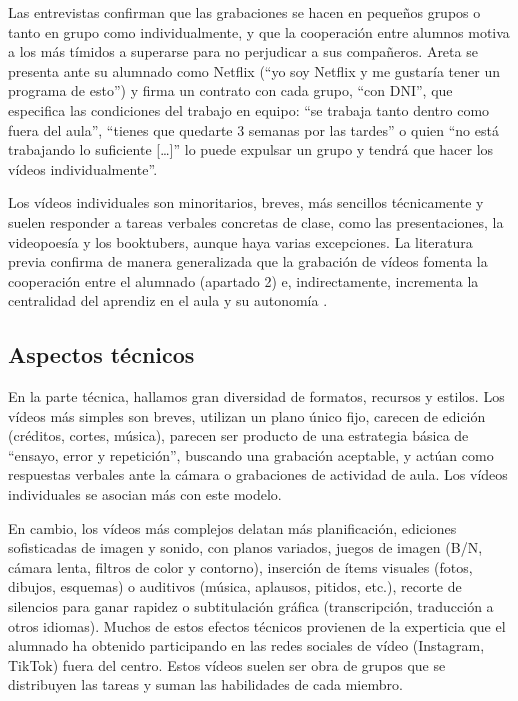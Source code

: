 \documentclass[spanish]{textolivre}
\begin{document}
Las entrevistas confirman que las grabaciones se hacen en pequeños grupos o tanto en grupo como individualmente, y que la cooperación entre alumnos motiva a los más tímidos a superarse para no perjudicar a sus compañeros. Areta se presenta ante su alumnado como Netflix (“yo soy Netflix y me gustaría tener un programa de esto”) y firma un contrato con cada grupo, “con DNI”, que especifica las condiciones del trabajo en equipo: “se trabaja tanto dentro como fuera del aula”, “tienes que quedarte 3 semanas por las tardes” o quien “no está trabajando lo suficiente […]” lo puede expulsar un grupo y tendrá que hacer los vídeos individualmente”.

Los vídeos individuales son minoritarios, breves, más sencillos técnicamente y suelen responder a tareas verbales concretas de clase, como las presentaciones, la videopoesía y los booktubers, aunque haya varias excepciones. La literatura previa confirma de manera generalizada que la grabación de vídeos fomenta la cooperación entre el alumnado (apartado 2) e, indirectamente, incrementa la centralidad del aprendiz en el aula y su autonomía \cite{vasquez_bustamante_aprendizaje_2013}.

\subsection{Aspectos técnicos}\label{sec-idioma}
En la parte técnica, hallamos gran diversidad de formatos, recursos y estilos. Los vídeos más simples son breves, utilizan un plano único fijo, carecen de edición (créditos, cortes, música), parecen ser producto de una estrategia básica de “ensayo, error y repetición”, buscando una grabación aceptable, y actúan como respuestas verbales ante la cámara o grabaciones de actividad de aula. Los vídeos individuales se asocian más con este modelo.

En cambio, los vídeos más complejos delatan más planificación, ediciones sofisticadas de imagen y sonido, con planos variados, juegos de imagen (B/N, cámara lenta, filtros de color y contorno), inserción de ítems visuales (fotos, dibujos, esquemas) o auditivos (música, aplausos, pitidos, etc.), recorte de silencios para ganar rapidez o subtitulación gráfica (transcripción, traducción a otros idiomas). Muchos de estos efectos técnicos provienen de la experticia que el alumnado ha obtenido participando en las redes sociales de vídeo (Instagram, TikTok) fuera del centro. Estos vídeos suelen ser obra de grupos que se distribuyen las tareas y suman las habilidades de cada miembro.
\end{document}
